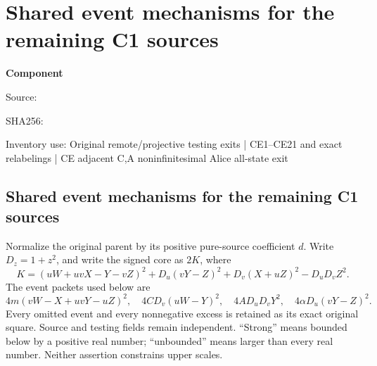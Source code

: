 \chapter{Shared event mechanisms for the remaining C1 sources}
\label{component:p89fd3edb3edd}
\noindent\textbf{Component }\par
{\small\noindent Source: \par}
{\small\noindent SHA256: \par}
{\small\noindent Inventory use: Original remote/projective testing exits | CE1--CE21 and exact relabelings | CE adjacent C,A noninfinitesimal Alice all-state exit\par}
\medskip
\section{Shared event mechanisms for the remaining C1 sources}
\label{p89fd3edb3edd:sec:r6-c1-common-remote}
Normalize the original parent by its positive pure-source coefficient $d$.
Write $D_z=1+z^2$, and write the signed core as $2K$, where
\[
 K=(uW+uvX-Y-vZ)^2+D_u(vY-Z)^2+D_v(X+uZ)^2-D_uD_vZ^2.
 \tag{CE1}
\]
The event packets used below are
\[
4m(vW-X+uvY-uZ)^2,\quad4CD_v(uW-Y)^2,
\quad4AD_uD_vY^2,\quad4\alpha D_u(vY-Z)^2.
\]
Every omitted event and every nonnegative excess is retained as its exact
original square. Source and testing fields remain independent. ``Strong''
means bounded below by a positive real number; ``unbounded'' means larger
than every real number. Neither assertion constrains upper scales.

